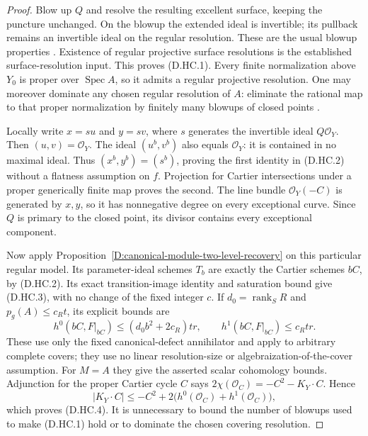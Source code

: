 \begin{proof}
Blow up $Q$ and resolve the resulting excellent surface, keeping the
puncture unchanged. On the blowup the extended ideal is invertible;
its pullback remains an invertible ideal on the regular resolution.
These are the usual blowup properties
\citep[Lemmas~31.33.4--31.33.5, Tag~01OF]{StacksHereditaryCartierD}.
Existence of regular projective surface resolutions is the established
surface-resolution input. This proves (D.HC.1).
Every finite normalization above $Y_0$ is proper over
$\operatorname{Spec}A$, so it admits a regular projective resolution.
One may moreover dominate any chosen regular resolution of $A$:
eliminate the rational map to that proper normalization by finitely
many blowups of closed points
\citep[Lemma~54.4.3, Tag~0C5H]{StacksHereditaryCartierD}.

Locally write $x=su$ and $y=sv$, where $s$ generates the invertible
ideal $Q\mathcal O_Y$. Then $(u,v)=\mathcal O_Y$.
The ideal $(u^b,v^b)$ also equals $\mathcal O_Y$: it is contained
in no maximal ideal. Thus $(x^b,y^b)=(s^b)$, proving the first
identity in (D.HC.2) without a flatness assumption on $f$.
Projection for Cartier intersections under a proper generically
finite map proves the second. The line bundle $\mathcal O_Y(-C)$
is generated by $x,y$, so it has nonnegative degree on every
exceptional curve. Since $Q$ is primary to the closed point,
its divisor contains every exceptional component.

Now apply Proposition~\ref{D:canonical-module-two-level-recovery}
on this particular regular model. Its parameter-ideal schemes
$T_b$ are exactly the Cartier schemes $bC$, by (D.HC.2).
Its exact transition-image identity and saturation bound give
(D.HC.3), with no change of the fixed integer $c$.
If $d_0=\operatorname{rank}_S R$ and $p_g(A)\le c_Rt$, its
explicit bounds are
\[
 h^0(bC,F|_{bC})\le(d_0b^2+2c_R)tr,\qquad
 h^1(bC,F|_{bC})\le c_Rtr.                              \tag{D.HC.5}
\]
These use only the fixed canonical-defect annihilator and apply
to arbitrary complete covers; they use no linear resolution-size
or algebraization-of-the-cover assumption.
For $M=A$ they give the asserted scalar cohomology bounds.
Adjunction for the proper Cartier cycle $C$ says
$2\chi(\mathcal O_C)=-C^2-K_Y\cdot C$. Hence
\[
 |K_Y\cdot C|\le -C^2+
                    2\bigl(h^0(\mathcal O_C)+h^1(\mathcal O_C)\bigr),
\]
which proves (D.HC.4). It is unnecessary to bound the number of
blowups used to make (D.HC.1) hold or to dominate the chosen
covering resolution.
\end{proof}

